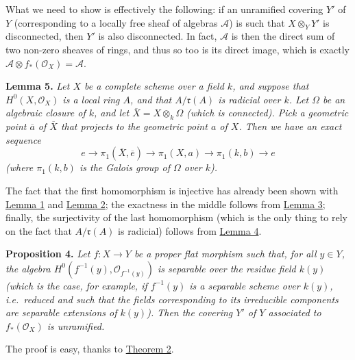 \documentclass{article}
\newenvironment{itenv}[1]
  {\phantomsection\par\smallskip\noindent\textbf{#1.}\itshape}
  {\par\smallskip}
\newcommand{\oldpage}[1]{\marginpar{\footnotesize$\Big\vert$ \textit{p.~#1}}}
\theoremstyle{definition}
\theoremstyle{definition}
\theoremstyle{definition}
\theoremstyle{definition}
\theoremstyle{remark}
\begin{document}
What we need to show is effectively the following: if an unramified covering \(Y'\) of \(Y\) (corresponding to a locally free sheaf of algebras \({\mathscr{A}}\)) is such that \(X\otimes_YY'\) is disconnected, then \(Y'\) is also disconnected.
In fact, \({\mathscr{A}}\) is then the direct sum of two non-zero sheaves of rings, and thus so too is its direct image, which is exactly \({\mathscr{A}}\otimes f_*({\mathscr{O}}_X)={\mathscr{A}}\).

\leavevmode{}%
\begin{itenv}{Lemma 5}
Let \(X\) be a complete scheme over a field \(k\), and suppose that \(H^0(X,{\mathscr{O}}_X)\) is a local ring \(A\), and that \(A/{\mathfrak{r}}(A)\) is radicial over \(k\).
Let \(\Omega\) be an algebraic closure of \(k\), and let \(\overline{X}=X\otimes_k\Omega\) (which is connected).
Pick a geometric point \(\overline{a}\) of \(\overline{X}\) that projects to the geometric point \(a\) of \(X\).
Then we have an exact sequence
\[
  e
  \to \pi_1(\overline{X},\overline{e})
  \to \pi_1(X,a)
  \to \pi_1(k,b)
  \to e
\]
(where \(\pi_1(k,b)\) is the Galois group of \(\Omega\) over \(k\)).

\end{itenv}

The fact that the first homomorphism is injective has already been shown with \protect\hyperlink{fga-2-lemma-1}{Lemma 1} and \protect\hyperlink{fga-2-lemma-2}{Lemma 2};
the exactness in the middle follows from \protect\hyperlink{fga-2-lemma-3}{Lemma 3};
finally, the surjectivity of the last homomorphism (which is the only thing to rely on the fact that \(A/{\mathfrak{r}}(A)\) is radicial) follows from \protect\hyperlink{fga-2-lemma-4}{Lemma 4}.

\leavevmode{}%
\begin{itenv}{Proposition 4}
Let \(f\colon X\to Y\) be a proper flat morphism such that, for all \(y\in Y\), the algebra \(H^0(f^{-1}(y),{\mathscr{O}}_{f^{-1}(y)})\) is separable over the residue field \(k(y)\) (which is the case, for example, if \(f^{-1}(y)\) is a \emph{separable scheme} over \(k(y)\), i.e.~reduced and such that the fields corresponding to its irreducible components are separable extensions of \(k(y)\)).
\oldpage{182-21}Then the covering \(Y'\) of \(Y\) associated to \(f_*({\mathscr{O}}_X)\) is unramified.

\end{itenv}

The proof is easy, thanks to \protect\hyperlink{fga-2-theorem-2}{Theorem 2}.
\end{document}
